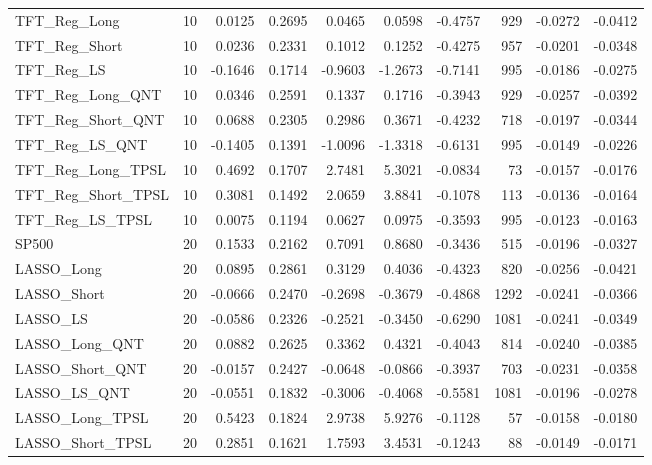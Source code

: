 \begin{tabular}{llrrrrrrrr}
\cline{1-10}
TFT\_Reg\_Long & 10 & 0.0125 & 0.2695 & 0.0465 & 0.0598 & -0.4757 & 929 & -0.0272 & -0.0412 \\
\cline{1-10}
TFT\_Reg\_Short & 10 & 0.0236 & 0.2331 & 0.1012 & 0.1252 & -0.4275 & 957 & -0.0201 & -0.0348 \\
\cline{1-10}
TFT\_Reg\_LS & 10 & -0.1646 & 0.1714 & -0.9603 & -1.2673 & -0.7141 & 995 & -0.0186 & -0.0275 \\
\cline{1-10}
TFT\_Reg\_Long\_QNT & 10 & 0.0346 & 0.2591 & 0.1337 & 0.1716 & -0.3943 & 929 & -0.0257 & -0.0392 \\
\cline{1-10}
TFT\_Reg\_Short\_QNT & 10 & 0.0688 & 0.2305 & 0.2986 & 0.3671 & -0.4232 & 718 & -0.0197 & -0.0344 \\
\cline{1-10}
TFT\_Reg\_LS\_QNT & 10 & -0.1405 & 0.1391 & -1.0096 & -1.3318 & -0.6131 & 995 & -0.0149 & -0.0226 \\
\cline{1-10}
TFT\_Reg\_Long\_TPSL & 10 & 0.4692 & 0.1707 & 2.7481 & 5.3021 & -0.0834 & 73 & -0.0157 & -0.0176 \\
\cline{1-10}
TFT\_Reg\_Short\_TPSL & 10 & 0.3081 & 0.1492 & 2.0659 & 3.8841 & -0.1078 & 113 & -0.0136 & -0.0164 \\
\cline{1-10}
TFT\_Reg\_LS\_TPSL & 10 & 0.0075 & 0.1194 & 0.0627 & 0.0975 & -0.3593 & 995 & -0.0123 & -0.0163 \\
\cline{1-10}
SP500 & 20 & 0.1533 & 0.2162 & 0.7091 & 0.8680 & -0.3436 & 515 & -0.0196 & -0.0327 \\
\cline{1-10}
LASSO\_Long & 20 & 0.0895 & 0.2861 & 0.3129 & 0.4036 & -0.4323 & 820 & -0.0256 & -0.0421 \\
\cline{1-10}
LASSO\_Short & 20 & -0.0666 & 0.2470 & -0.2698 & -0.3679 & -0.4868 & 1292 & -0.0241 & -0.0366 \\
\cline{1-10}
LASSO\_LS & 20 & -0.0586 & 0.2326 & -0.2521 & -0.3450 & -0.6290 & 1081 & -0.0241 & -0.0349 \\
\cline{1-10}
LASSO\_Long\_QNT & 20 & 0.0882 & 0.2625 & 0.3362 & 0.4321 & -0.4043 & 814 & -0.0240 & -0.0385 \\
\cline{1-10}
LASSO\_Short\_QNT & 20 & -0.0157 & 0.2427 & -0.0648 & -0.0866 & -0.3937 & 703 & -0.0231 & -0.0358 \\
\cline{1-10}
LASSO\_LS\_QNT & 20 & -0.0551 & 0.1832 & -0.3006 & -0.4068 & -0.5581 & 1081 & -0.0196 & -0.0278 \\
\cline{1-10}
LASSO\_Long\_TPSL & 20 & 0.5423 & 0.1824 & 2.9738 & 5.9276 & -0.1128 & 57 & -0.0158 & -0.0180 \\
\cline{1-10}
LASSO\_Short\_TPSL & 20 & 0.2851 & 0.1621 & 1.7593 & 3.4531 & -0.1243 & 88 & -0.0149 & -0.0171 \\

\end{tabular}
